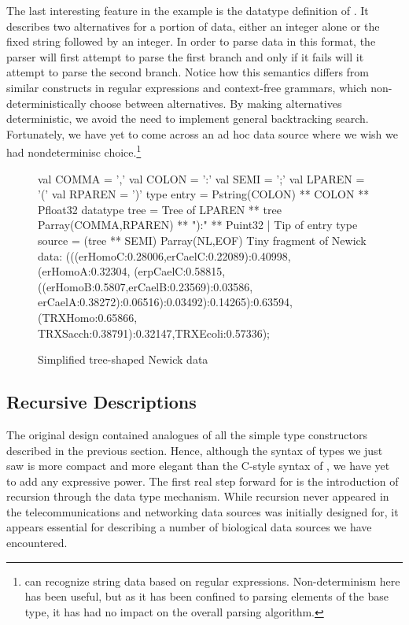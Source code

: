 The last interesting feature in the \dibbler{} example is the
datatype definition of .  It describes
two alternatives for a portion of data, either an integer alone
or the fixed string  followed by an integer.
In order to parse data in this format, the parser will
first attempt to parse the first branch and only if it
fails will it attempt to parse the second branch.
Notice how this semantics differs from similar constructs in
regular expressions and context-free grammars, which
non-deterministically choose between alternatives.
By making alternatives deterministic, we avoid
the need to implement general backtracking search.  
Fortunately, we have yet to come across an ad hoc data source
where we wish we had nondeterminisc choice.\footnote{\pads{}
can recognize string data based on regular expressions.
Non-determinism here has been useful, but as it
has been confined to parsing elements of the  
base type, it has had no impact on the overall parsing 
algorithm.}

\begin{figure}
\begin{code}
val COMMA  = ','
val COLON  = ':'
val SEMI   = ';'
val LPAREN = '('
val RPAREN = ')'
\mbox{}
type entry = Pstring(COLON) ** COLON ** Pfloat32
\mbox{}
datatype tree =
    Tree of LPAREN ** tree Parray(COMMA,RPAREN) ** "):" ** Puint32
  | Tip of entry
\mbox{}
type source = (tree ** SEMI) Parray(NL,EOF)
\mbox{}
{\rm Tiny fragment of Newick data:} 
\mbox{}
(((erHomoC:0.28006,erCaelC:0.22089):0.40998,(erHomoA:0.32304,
(erpCaelC:0.58815,((erHomoB:0.5807,erCaelB:0.23569):0.03586,
erCaelA:0.38272):0.06516):0.03492):0.14265):0.63594,(TRXHomo:0.65866,
TRXSacch:0.38791):0.32147,TRXEcoli:0.57336);
\end{code}
\caption{Simplified tree-shaped Newick data}
\label{fig:newick}
\end{figure}

\subsection{Recursive Descriptions}

The original \pads{} design contained analogues of all the 
simple type constructors described in the previous section.
Hence, although the syntax of types we just saw
is more compact and more elegant than the C-style syntax 
of \pads, we have yet to add any expressive power. 
The first real step forward for \datatype{} is the introduction
of recursion through the data type mechanism.  While
recursion never appeared in the telecommunications and 
networking data sources \pads{} was initially designed for, it
appears essential for describing a number of biological
data sources we have encountered.
  
